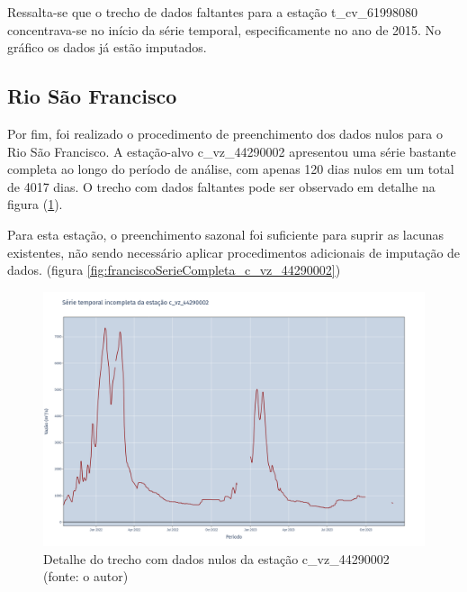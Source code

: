 Ressalta-se que o trecho de dados faltantes para a estação t\_cv\_61998080 concentrava-se no início da série temporal, especificamente no ano de 2015. No gráfico os dados já estão imputados.

\subsection{Rio São Francisco}

Por fim, foi realizado o procedimento de preenchimento dos dados nulos para o Rio São Francisco. A estação-alvo c\_vz\_44290002 apresentou uma série bastante completa ao longo do período de análise, com apenas 120 dias nulos em um total de 4017 dias. O trecho com dados faltantes pode ser observado em detalhe na figura (\ref{fig:franciscoSerieIncompleta_c_vz_44290002-detalhe}).

Para esta estação, o preenchimento sazonal foi suficiente para suprir as lacunas existentes, não sendo necessário aplicar procedimentos adicionais de imputação de dados. (figura \ref{fig:franciscoSerieCompleta_c_vz_44290002})

\begin{figure}[!h]
\centering
\includegraphics[scale=0.25]{Figuras/rio_sao_francisco/franciscoSerieIncompleta_c_vz_44290002-detalhe.png}
\caption{Detalhe do trecho com dados nulos da estação c\_vz\_44290002 (fonte: o autor)}
\label{fig:franciscoSerieIncompleta_c_vz_44290002-detalhe}
\end{figure}

